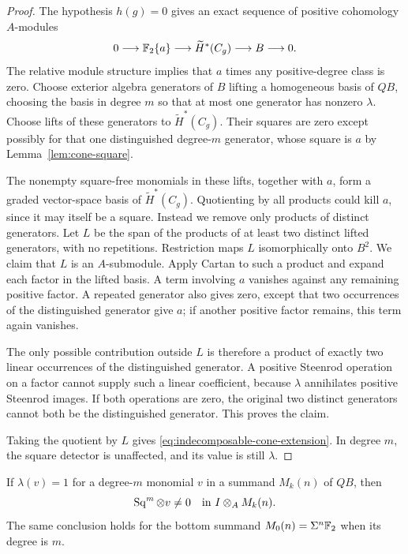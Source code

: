 \begin{proof}
The hypothesis \(h(g)=0\) gives an exact sequence of positive
cohomology \(A\)-modules
\[
0\longrightarrow\mathbb F_2\{a\}\longrightarrow\widetilde H^*(C_g)
\longrightarrow B\longrightarrow0.
\]
The relative module structure implies that \(a\) times any
positive-degree class is zero. Choose exterior algebra generators of
\(B\) lifting a homogeneous basis of \(Q B\), choosing the basis in
degree \(m\) so that at most one generator has nonzero \(\lambda\).
Choose lifts of these generators to \(\widetilde H^*(C_g)\).
Their squares are zero except possibly for that one distinguished
degree-\(m\) generator, whose square is \(a\) by
Lemma~\ref{lem:cone-square}.

The nonempty square-free monomials in these lifts, together with \(a\), form a
graded vector-space basis of \(\widetilde H^*(C_g)\). Quotienting by
all products could kill \(a\), since it may itself be a square.
Instead we remove only products of distinct generators.
Let \(L\) be the span of the products of at least two distinct lifted
generators, with no repetitions. Restriction maps \(L\) isomorphically
onto \(B^2\). We claim that \(L\) is an \(A\)-submodule. Apply
Cartan to such a product and expand each factor in the lifted basis.
A term involving \(a\) vanishes against any remaining positive factor.
A repeated generator also gives zero, except that two occurrences of
the distinguished generator give \(a\); if another positive factor
remains, this term again vanishes.

The only possible contribution outside \(L\) is therefore a product
of exactly two linear occurrences of the distinguished generator.
A positive Steenrod operation on a factor cannot supply such a linear
coefficient, because \(\lambda\) annihilates positive Steenrod
images. If both operations are zero, the original two distinct
generators cannot both be the distinguished generator. This proves
the claim.

Taking the quotient by \(L\) gives
\eqref{eq:indecomposable-cone-extension}. In degree \(m\), the
square detector is unaffected, and its value is still \(\lambda\).
\end{proof}

\begin{corollary}\label{cor:tensor-detection}
If \(\lambda(v)=1\) for a degree-\(m\) monomial \(v\) in a
summand \(M_k(n)\) of \(Q B\), then
\begin{equation}\label{eq:tensor-detection}
\operatorname{Sq}^m\otimes v\ne0\quad\text{in }I\otimes_A M_k(n).
\end{equation}
The same conclusion holds for the bottom summand
\(M_0(n)=\Sigma^n\mathbb F_2\) when its degree is \(m\).
\end{corollary}

